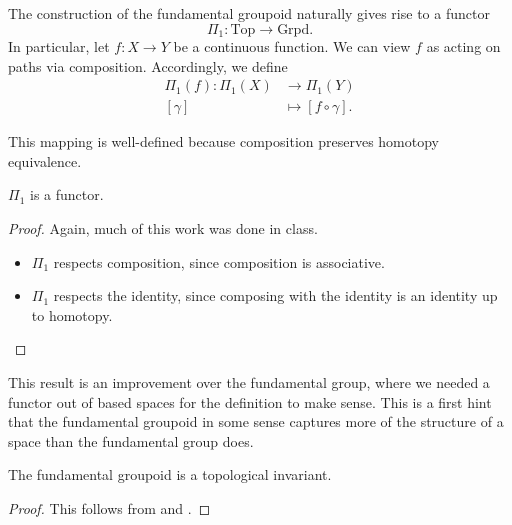 The construction of the fundamental groupoid naturally gives rise to a functor
$$\Pi_1: \text{Top}\rightarrow\text{Grpd}.$$ In particular, let $f:
	X\rightarrow Y$ be a continuous function. We can view $f$ as acting on paths
via composition. Accordingly, we define
\begin{align*}
	\Pi_1(f)  \colon \Pi_1(X) & \to \Pi_1(Y)            \\
	[\gamma]                  & \mapsto [f\circ\gamma].
\end{align*}

This mapping is well-defined because composition preserves homotopy equivalence.

\begin{prop}\label{fund-is-functor}
	$\Pi_1$ is a functor.
\end{prop}

\begin{proof}
	Again, much of this work was done in class.
	\begin{itemize}
		\item $\Pi_1$ respects composition, since composition is associative.
		\item $\Pi_1$ respects the identity, since composing with the identity is
		      an identity up to homotopy. \qedhere
	\end{itemize}
\end{proof}

This result is an improvement over the fundamental group, where we needed a
functor out of based spaces for the definition to make sense. This is a first
hint that the fundamental groupoid in some sense captures more of the structure
of a space than the fundamental group does.

\begin{cor}\label{fund-is-topological}
	The fundamental groupoid is a topological invariant.
\end{cor}

\begin{proof}
	This follows from  and .
\end{proof}
